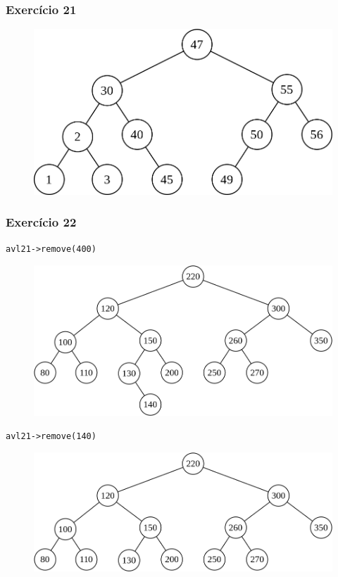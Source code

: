 \documentclass[aspectratio=169]{beamer}
\begin{document}
\begin{frame}[fragile]\frametitle{Exercício 21}
\begin{figure}[h]
	\centering
	\includegraphics[height=0.5\paperheight]{imagens/avl-exercicio21.png}
\end{figure}
\end{frame}

\begin{frame}[fragile]\frametitle{Exercício 22}
\texttt{avl21-\textgreater{}remove(400)}
\begin{figure}[h]
	\centering
	\includegraphics[height=0.32\paperheight]{imagens/avl-exercicio22b.png}
\end{figure}
\texttt{avl21-\textgreater{}remove(140)}
\begin{figure}[h]
	\centering
	\includegraphics[height=0.25\paperheight]{imagens/avl-exercicio22c.png}
\end{figure}
\end{frame}
\end{document}
